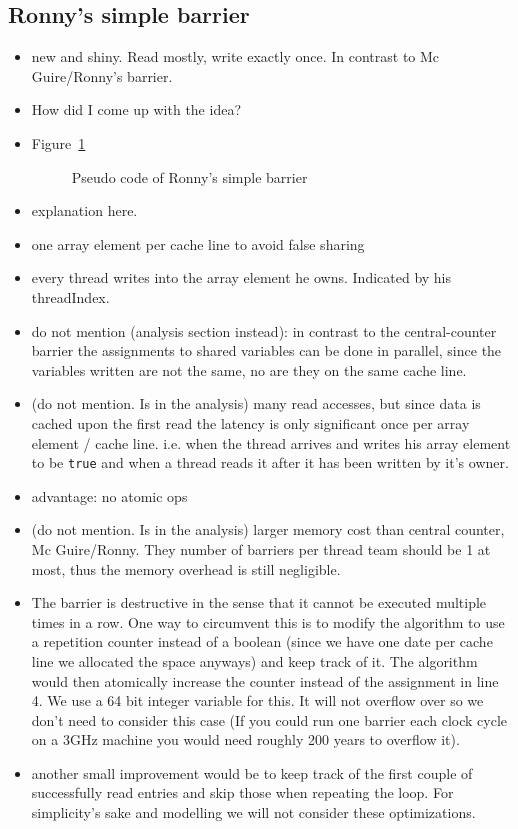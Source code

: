 \documentclass[a4paper, 10pt]{article}
\begin{document}
\begin{enumerate}
\subsection{Ronny's simple barrier}
\label{ssec:new-simple}
\begin{itemize}
	\item new and shiny. Read mostly, write exactly once. In contrast to Mc Guire/Ronny's barrier.
	\item How did I come up with the idea?
	\item Figure~\ref{fig:ronny-simple-no-reset}
		\begin{figure}[htbp]
			\centering
			
			\caption{Pseudo code of Ronny's simple barrier}
			\label{fig:ronny-simple-no-reset}
		\end{figure}
	\item explanation here.
	\item one array element per cache line to avoid false sharing\cite{falsesharing}
	\item every thread writes into the array element he owns. Indicated by his threadIndex.
	\item do not mention (analysis section instead): in contrast to the central-counter barrier the assignments to shared variables can be done in parallel, since the variables written are not the same, no are they on the same cache line.
	\item (do not mention. Is in the analysis) many read accesses, but since data is cached upon the first read the latency is only significant once per array element / cache line. i.e. when the thread arrives and writes his array element to be \texttt{true} and when a thread reads it after it has been written by it's owner.
	\item advantage: no atomic ops
	\item (do not mention. Is in the analysis) larger memory cost than central counter, Mc Guire/Ronny. They number of barriers per thread team should be 1 at most, thus the memory overhead is still negligible.
	\item The barrier is destructive in the sense that it cannot be executed multiple times in a row. One way to circumvent this is to modify the algorithm to use a repetition counter instead of a boolean (since we have one date per cache line we allocated the space anyways) and keep track of it. The algorithm would then atomically increase the counter instead of the assignment in line 4. We use a 64 bit integer variable for this. It will not overflow over so we don't need to consider this case (If you could run one barrier each clock cycle on a 3GHz machine you would need roughly 200 years to overflow it).
	\item another small improvement would be to keep track of the first couple of successfully read entries and skip those when repeating the loop. For simplicity's sake and modelling we will not consider these optimizations.
\end{itemize}


\end{enumerate}
\end{document}
